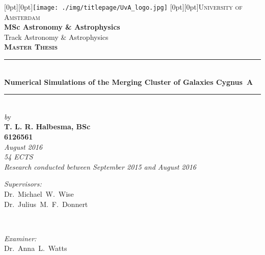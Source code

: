 \begin{titlepage}

\newcommand{\HRule}{\rule{\linewidth}{0.8mm}}
\center

\raisebox{-0.2cm}[0pt][0pt]{\texttt{[image: ./img/titlepage/UvA\_logo.jpg]}}
\raisebox{0.3cm}[0pt][0pt]{\textsc{\Huge University of Amsterdam}}\\[0 cm]

\Large{\textbf{MSc Astronomy \& Astrophysics}}\\  %
\Large{Track Astronomy \& Astrophysics}\\[0.7cm]  %
\textsc{\Large \textbf{Master Thesis}}\\[0.2cm]


\HRule \\[0.3cm]

{\LARGE \bfseries Numerical Simulations of the Merging Cluster of Galaxies Cygnus~A}\\[0.8cm]  %

\HRule \\[0.7cm]


{\large \emph by}\\[0.6cm]
{\large \bfseries T. L. R. Halbesma, BSc\\  %
6126561}\\[0.4cm] %
{\large  \emph{August 2016}}\\ %
{\large  \emph{54 ECTS}}\\ %
{\large  \emph{Research conducted between September 2015 and August 2016}}\\[1.8cm] %


\begin{minipage}{0.4\textwidth}
\begin{flushleft} \large
{\large \emph{Supervisors:}}\\

\large{Dr.~Michael~W.~Wise}\\  %
\large{Dr.~Julius~M.~F.~Donnert}  %
\end{flushleft}
\end{minipage}
~
\begin{minipage}{0.4\textwidth}
\begin{flushright} \large
\emph{Examiner:} \\
\large{Dr.~Anna~L.~Watts}  %
\end{flushright}
\end{minipage}\\



\end{titlepage}
